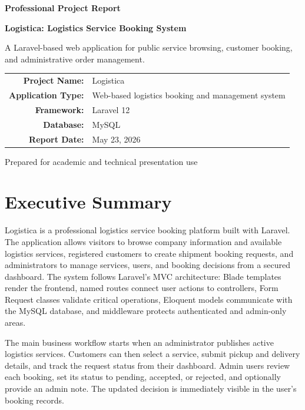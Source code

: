 \documentclass[12pt,a4paper]{report}
\newcommand{\project}{Logistica}
\begin{document}
\begin{titlepage}
    \centering
    \vspace*{1.5cm}
    {\Huge\bfseries\color{dark} Professional Project Report\par}
    \vspace{0.4cm}
    {\LARGE\bfseries\color{primary} \project: Logistics Service Booking System\par}
    \vspace{1.2cm}
    {\large A Laravel-based web application for public service browsing, customer booking, and administrative order management.\par}
    \vfill
    \begin{tabular}{rl}
        \textbf{Project Name:} & \project \\
        \textbf{Application Type:} & Web-based logistics booking and management system \\
        \textbf{Framework:} & Laravel 12 \\
        \textbf{Database:} & MySQL \\
        \textbf{Report Date:} & May 23, 2026 \\
    \end{tabular}
    \vfill
    {\large Prepared for academic and technical presentation use\par}
\end{titlepage}

\tableofcontents
\newpage

\chapter*{Executive Summary}

\project{} is a professional logistics service booking platform built with Laravel. The application allows visitors to browse company information and available logistics services, registered customers to create shipment booking requests, and administrators to manage services, users, and booking decisions from a secured dashboard. The system follows Laravel's MVC architecture: Blade templates render the frontend, named routes connect user actions to controllers, Form Request classes validate critical operations, Eloquent models communicate with the MySQL database, and middleware protects authenticated and admin-only areas.

The main business workflow starts when an administrator publishes active logistics services. Customers can then select a service, submit pickup and delivery details, and track the request status from their dashboard. Admin users review each booking, set its status to pending, accepted, or rejected, and optionally provide an admin note. The updated decision is immediately visible in the user's booking records.
\end{document}
